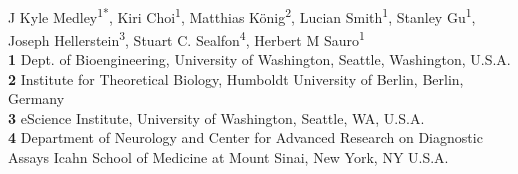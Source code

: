 \documentclass[10pt,letterpaper]{article}
\date{}
\begin{document}
\vspace*{0.2in}

\begin{flushleft}
{\Large
\textbf{} %
}
\newline
\\
J Kyle Medley\textsuperscript{1*},
Kiri Choi\textsuperscript{1},
Matthias K\"{o}nig\textsuperscript{2},
Lucian Smith\textsuperscript{1},
Stanley Gu\textsuperscript{1},
Joseph Hellerstein\textsuperscript{3},
Stuart C. Sealfon\textsuperscript{4},
Herbert M Sauro\textsuperscript{1}
\\
\bigskip
\textbf{1} Dept. of Bioengineering, University of Washington, Seattle, Washington, U.S.A.
\\
\textbf{2} Institute for Theoretical Biology, Humboldt University of Berlin, Berlin, Germany
\\
\textbf{3} eScience Institute, University of Washington, Seattle, WA, U.S.A.
\\
\textbf{4} Department of Neurology and Center for Advanced Research on Diagnostic Assays
Icahn School of Medicine at Mount Sinai, New York, NY U.S.A.
\\
\bigskip

%



%
%



\end{flushleft}
\end{document}
